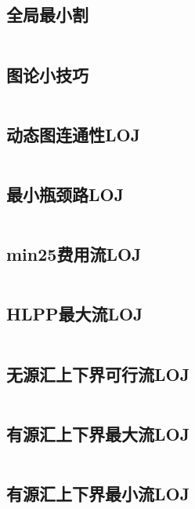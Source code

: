 \inputminted{cpp}{code/KM.cc}

\subsection{	全局最小割} 

\inputminted{cpp}{code/全局最小割.cc}

\subsection{	图论小技巧} 

\inputminted{cpp}{code/图论小技巧.cc}

\subsection{动态图连通性LOJ} 

\inputminted{cpp}{code/动态图连通性.cc}

\subsection{最小瓶颈路LOJ} 

\inputminted{cpp}{code/最小瓶颈路.cc}

\subsection{min25费用流LOJ} 

\inputminted{cpp}{code/min_25费用流.cc}

\subsection{	HLPP最大流LOJ} 

\inputminted{cpp}{code/HLPP最大流.cc}

\subsection{无源汇上下界可行流LOJ} 

\inputminted{cpp}{code/无源汇上下界可行流.cc}

\subsection{有源汇上下界最大流LOJ} 

\inputminted{cpp}{code/有源汇上下界最大流.cc}

\subsection{有源汇上下界最小流LOJ} 

